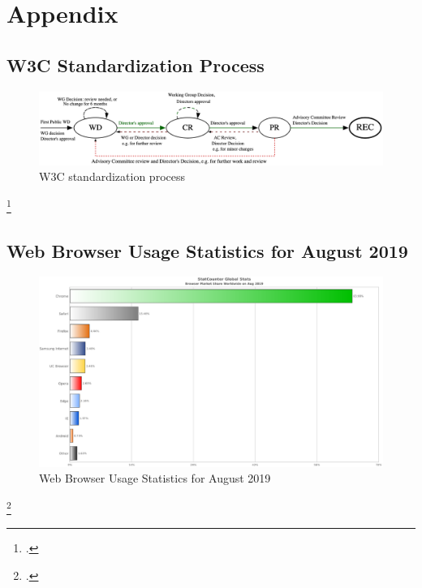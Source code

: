 \appendix

\chapter{Appendix}

\section{W3C Standardization Process}
\label{sec:w3c-process}

\begin{figure}[hbt]
	\centering
	\includegraphics[scale=0.15,angle=90]{pics/svg/w3c_process.eps}
	\caption[W3C standardization process]{W3C standardization process\footnotemark}
	\label{fig:w3c}
\end{figure}
\footcitetext[Source:][Chapter 6.7]{w3c-process}

\newpage

\section{Web Browser Usage Statistics for August 2019}
\label{sec:stats}

\begin{figure}[hbt]
	\centering
	\includegraphics[scale=0.48,angle=90]{pics/StatCounter-browser-ww-monthly-201908-201908-bar.eps}
	\caption[Web Browser Usage Statistics for August 2019]{Web Browser Usage Statistics for August 2019\footnotemark}
	\label{fig:stats}
\end{figure}
\footcitetext[Source][]{statcounter-global}

